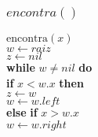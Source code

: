 \documentclass{beamer}
\begin{document}
\begin{frame}[shrink]
\frametitle{$encontra()$}
\begin{oframed}
\begin{flushleft}
\hspace*{1em} \ensuremath{\mathrm{encontra}(\ensuremath{\mathit{x}})}\\
\hspace*{1em} \hspace*{1em} \ensuremath{\ensuremath{\mathit{w}} \gets  \ensuremath{raiz}}\\
\hspace*{1em} \hspace*{1em} \ensuremath{\ensuremath{\mathit{z}} \gets  \ensuremath{nil}}\\
\hspace*{1em} \hspace*{1em} {\color{black} \textbf{while}} \ensuremath{\ensuremath{\mathit{w}} \ne nil} {\color{black} \textbf{do}} \\
\hspace*{1em} \hspace*{1em} \hspace*{1em} {\color{black} \textbf{if}} \ensuremath{\ensuremath{\mathit{x}} < \ensuremath{\mathit{w}}.x} {\color{black} \textbf{then}} \\
\hspace*{1em} \hspace*{1em} \hspace*{1em} \hspace*{1em} \ensuremath{\ensuremath{\mathit{z}} \gets  \ensuremath{w}}\\
\hspace*{1em} \hspace*{1em} \hspace*{1em} \hspace*{1em} \ensuremath{\ensuremath{\mathit{w}} \gets  \ensuremath{\ensuremath{\mathit{w}}.left}}\\
\hspace*{1em} \hspace*{1em} \hspace*{1em} {\color{black} \textbf{else}} {\color{black} \textbf{if}} \ensuremath{\ensuremath{\mathit{x}} > \ensuremath{\mathit{w}}.\ensuremath{\mathit{x}}}\\
\hspace*{1em} \hspace*{1em} \hspace*{1em} \hspace*{1em} \ensuremath{\ensuremath{\mathit{w}} \gets  \ensuremath{\ensuremath{\mathit{w}}.right}}\\

\end{flushleft}
\end{oframed}
\end{frame}
\end{document}
